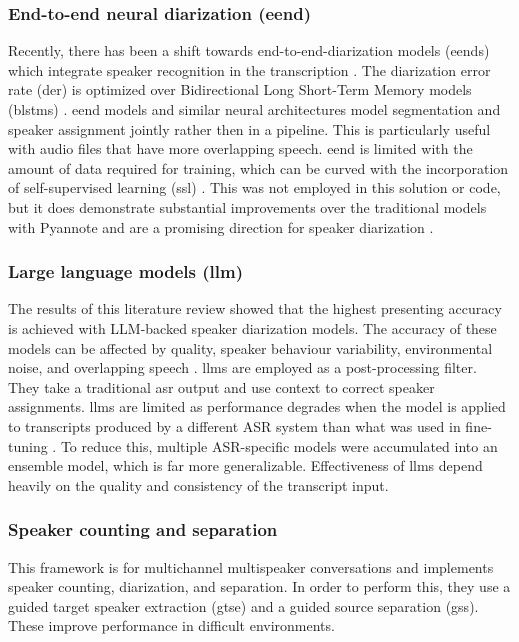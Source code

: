 \documentclass{article}
\begin{document}
\subsubsection{End-to-end neural diarization (\gls{eend})}
Recently, there has been a shift towards end-to-end-diarization models (\gls{eend}s) which integrate speaker recognition in the transcription \cite{efstathiadis2025}. The diarization error rate (\gls{der}) is optimized over  Bidirectional Long Short-Term Memory models (\gls{blstm}s) \cite{efstathiadis2025}. \newline
\gls{eend} models and similar neural architectures model segmentation and speaker assignment jointly rather then in a pipeline. This is particularly useful with audio files that have more overlapping speech. \newline
\gls{eend} is limited with the amount of data required for training, which can be curved with the incorporation of self-supervised learning (\gls{ssl}) \cite{han2025}. This was not employed in this solution or code, but it does demonstrate substantial improvements over the traditional models with Pyannote and are a promising direction for speaker diarization \cite{han2025}. 

\subsubsection{Large language models (\gls{llm})}
The results of this literature review showed that the highest presenting accuracy is achieved with LLM-backed speaker diarization models. \newline
The accuracy of these models can be affected by quality, speaker behaviour variability, environmental noise, and overlapping speech \cite{efstathiadis2025}. \newline
\gls{llm}s are employed as a post-processing filter. They take a traditional \gls{asr} output and use context to correct speaker assignments. \newline
\gls{llm}s are limited as performance degrades when the model is applied to transcripts produced by a different ASR system than what was used in fine-tuning \cite{efstathiadis2025}. To reduce this, multiple ASR-specific models were accumulated into an ensemble model, which is far more generalizable. Effectiveness of \gls{llm}s depend heavily on the quality and consistency of the transcript input.

\subsubsection{Speaker counting and separation}
This framework is for multichannel multispeaker conversations and implements speaker counting, diarization, and separation. In order to perform this, they use a guided target speaker extraction (\gls{gtse}) and a guided source separation (\gls{gss}).  These improve performance in difficult environments. 
\end{document}
